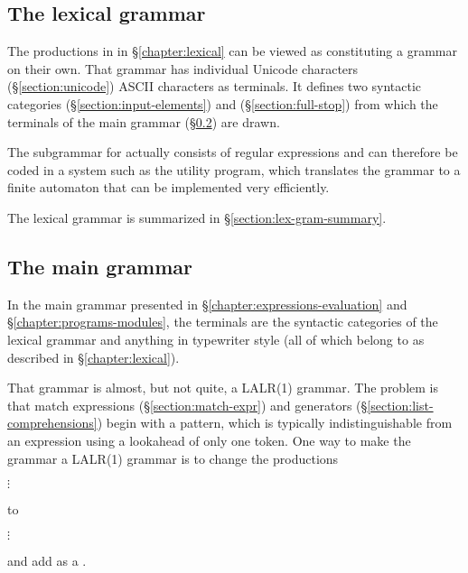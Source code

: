 \subsection{The lexical grammar}

\label{section:lexical-grammar}

The productions in in \S\ref{chapter:lexical} can be viewed as
constituting a grammar on their own.  That grammar has individual
\ifStd Unicode characters (\S\ref{section:unicode}) \else ASCII characters \fi
as terminals.  It defines two syntactic categories 
(\S\ref{section:input-elements}) and 
(\S\ref{section:full-stop}) from which the terminals of the main
grammar (\S\ref{section:main-grammar}) are drawn.

The subgrammar for  actually consists of regular expressions
and can therefore be coded in a system such as the  utility
program, which translates the grammar to a finite automaton that can
be implemented very efficiently.

The lexical grammar is summarized in \S\ref{section:lex-gram-summary}.

\subsection{The main grammar}

\label{section:main-grammar}

In the main grammar presented in \S\ref{chapter:expressions-evaluation} and
\S\ref{chapter:programs-modules},
the terminals are the syntactic categories of the lexical grammar
and anything in typewriter style (all of which belong to
 as described in \S\ref{chapter:lexical}).

That grammar is almost, but not quite, a LALR(1)
grammar.  The problem is that match
expressions (\S\ref{section:match-expr}) and generators
(\S\ref{section:list-comprehensions}) begin with a pattern, which is
typically indistinguishable from an expression using a lookahead of
only one token.  One way to make the grammar a LALR(1) grammar is to
change the productions
\begin{rules}
       { \TXT{=}  \OR
        $\vdots$}
       { \TXT{<-} }
\end{rules}
to
\begin{rules}
       { \TXT{=}  \OR
        $\vdots$}
       { \TXT{<-} }
\end{rules}
and add  as a .

